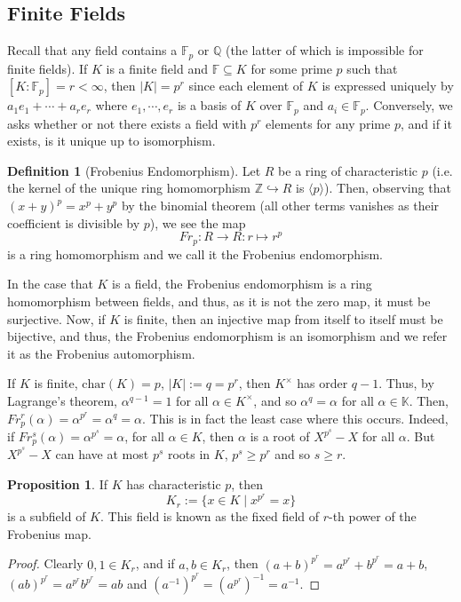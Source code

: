 \documentclass[]{article}
\theoremstyle{definition}
\theoremstyle{definition}
\newtheorem{definition}{Definition}[section]
\newtheorem{proposition}{Proposition}[section]
\begin{document}
\subsection{Finite Fields}

Recall that any field contains a \(\mathbb{F}_p\) or \(\mathbb{Q}\) 
(the latter of which is impossible for finite fields). If \(K\) is a finite 
field and \(\mathbb{F} \subseteq K\) for some prime \(p\) such that 
\([K : \mathbb{F}_p] = r < \infty\), then \(|K| = p^r\) since each element of 
\(K\) is expressed uniquely by \(a_1 e_1 + \cdots + a_r e_r\) where 
\(e_1, \cdots, e_r\) is a basis of \(K\) over \(\mathbb{F}_p\) and 
\(a_i \in \mathbb{F}_p\). Conversely, we asks whether or not there exists a 
field with \(p^r\) elements for any prime \(p\), and if it exists, is it 
unique up to isomorphism.

\begin{definition}[Frobenius Endomorphism]
  Let \(R\) be a ring of characteristic \(p\) (i.e. the kernel of the unique 
  ring homomorphism \(\mathbb{Z} \hookrightarrow R\) is \(\langle p \rangle\)). 
  Then, observing that \((x + y)^p = x^p + y^p\) by the binomial theorem 
  (all other terms vanishes as their coefficient is divisible by \(p\)), we 
  see the map 
  \[Fr_p : R \to R : r  \mapsto r^p\] 
  is a ring homomorphism and we call it the Frobenius endomorphism.
\end{definition}

In the case that \(K\) is a field, the Frobenius endomorphism is a 
ring homomorphism between fields, and thus, as it is not the zero map, it 
must be surjective. Now, if \(K\) is finite, then an injective map from 
itself to itself must be bijective, and thus, the Frobenius endomorphism is 
an isomorphism and we refer it as the Frobenius automorphism.

If \(K\) is finite, \(\text{char}(K) = p\), \(|K| := q = p^r\), then 
\(K^\times\) has order \(q - 1\). Thus, by Lagrange's theorem, 
\(\alpha^{q - 1} = 1\) for all \(\alpha \in K^\times\), and so 
\(\alpha^q = \alpha\) for all \(\alpha \in \mathbb{K}\). Then, 
\(Fr_p^r(\alpha) = \alpha^{p^r} = \alpha^q = \alpha\). This is in fact the 
least case where this occurs. Indeed, if \(Fr_p^s(\alpha) = \alpha^{p^s} = \alpha\), 
for all \(\alpha \in K\), then \(\alpha\) is a root of \(X^{p^s} - X\) for all 
\(\alpha\). But \(X^{p^s} - X\) can have at most \(p^s\) roots in \(K\), 
\(p^s \ge p^r\) and so \(s \ge r\).

\begin{proposition}
  If \(K\) has characteristic \(p\), then 
  \[K_r := \{x \in K \mid x^{p^r} = x\}\]
  is a subfield of \(K\). This field is known as the fixed field of \(r\)-th 
  power of the Frobenius map.
\end{proposition}
\begin{proof}
  Clearly \(0, 1 \in K_r\), and if \(a, b \in K_r\), then 
  \((a + b)^{p^r} = a^{p^r} + b^{p^r} = a + b\), 
  \((ab)^{p^r} = a^{p^r}b^{p^r} = ab\) and 
  \((a^{-1})^{p^r} = (a^{p^r})^{-1} = a^{-1}\).
\end{proof}
\end{document}
